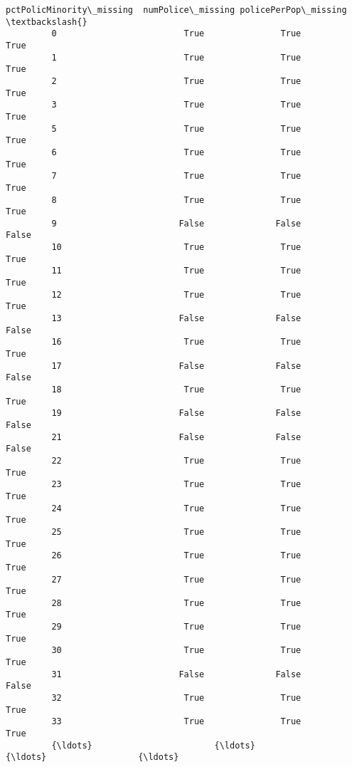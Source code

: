 \documentclass[11pt]{llncs}
\begin{document}
\begin{Verbatim}[commandchars=\\\{\}]
               pctPolicMinority\_missing  numPolice\_missing policePerPop\_missing  \textbackslash{}
         0                         True               True                 True   
         1                         True               True                 True   
         2                         True               True                 True   
         3                         True               True                 True   
         5                         True               True                 True   
         6                         True               True                 True   
         7                         True               True                 True   
         8                         True               True                 True   
         9                        False              False                False   
         10                        True               True                 True   
         11                        True               True                 True   
         12                        True               True                 True   
         13                       False              False                False   
         16                        True               True                 True   
         17                       False              False                False   
         18                        True               True                 True   
         19                       False              False                False   
         21                       False              False                False   
         22                        True               True                 True   
         23                        True               True                 True   
         24                        True               True                 True   
         25                        True               True                 True   
         26                        True               True                 True   
         27                        True               True                 True   
         28                        True               True                 True   
         29                        True               True                 True   
         30                        True               True                 True   
         31                       False              False                False   
         32                        True               True                 True   
         33                        True               True                 True   
         {\ldots}                        {\ldots}                {\ldots}                  {\ldots}   

\end{Verbatim}
\end{document}
